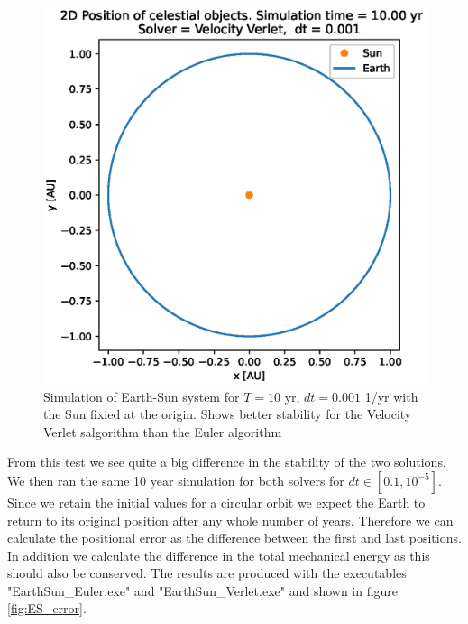 \documentclass[american,a4paper,12pt]{article}
\begin{document}
\begin{figure}[H]
\begin{minipage}[b]{0.49\textwidth}
    \includegraphics[width=\textwidth]{figures/Earth_Sun_10yr_Stable_Verlet.eps}
  \end{minipage}
  \caption{Simulation of Earth-Sun system for $T = 10$ yr, $dt = 0.001$ 1/yr with the Sun fixied at the origin. Shows better stability for the Velocity Verlet salgorithm than the Euler algorithm}
  \label{fig:ES_initial_run}
\end{figure}
From this test we see quite a big difference in the stability of the two solutions. We then ran the same 10 year simulation for both solvers for $dt \in [0.1, 10^{-5}]$. Since we retain the initial values for a circular orbit we expect the Earth to return to its original position after any whole number of years. Therefore we can calculate the positional error as the difference between the first and last positions. In addition we calculate the difference in the total mechanical energy as this should also be conserved. The results are produced with the executables "EarthSun\_Euler.exe" and "EarthSun\_Verlet.exe" and shown in figure \ref{fig:ES_error}. 
\end{document}
